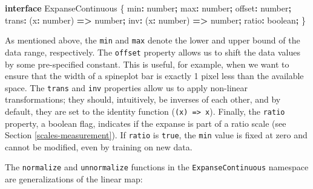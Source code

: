\documentclass[
  openany]{book}
\newenvironment{Shaded}{\begin{snugshade}}{\end{snugshade}}
\newcommand{\DataTypeTok}[1]{\textcolor[rgb]{0.13,0.29,0.53}{#1}}
\newcommand{\KeywordTok}[1]{\textcolor[rgb]{0.13,0.29,0.53}{\textbf{#1}}}
\newcommand{\NormalTok}[1]{#1}
\newcommand{\OperatorTok}[1]{\textcolor[rgb]{0.81,0.36,0.00}{\textbf{#1}}}
\theoremstyle{definition}
\theoremstyle{definition}
\theoremstyle{definition}
\theoremstyle{definition}
\theoremstyle{remark}
\begin{document}
\begin{Shaded}
\begin{Highlighting}[]
\KeywordTok{interface}\NormalTok{ ExpanseContinuous \{}
\NormalTok{  min}\OperatorTok{:} \DataTypeTok{number}\OperatorTok{;}
\NormalTok{  max}\OperatorTok{:} \DataTypeTok{number}\OperatorTok{;}
\NormalTok{  offset}\OperatorTok{:} \DataTypeTok{number}\OperatorTok{;}
\NormalTok{  trans}\OperatorTok{:}\NormalTok{ (x}\OperatorTok{:} \DataTypeTok{number}\NormalTok{) }\KeywordTok{=\textgreater{}} \DataTypeTok{number}\OperatorTok{;}
\NormalTok{  inv}\OperatorTok{:}\NormalTok{ (x}\OperatorTok{:} \DataTypeTok{number}\NormalTok{) }\KeywordTok{=\textgreater{}} \DataTypeTok{number}\OperatorTok{;}
\NormalTok{  ratio}\OperatorTok{:} \DataTypeTok{boolean}\OperatorTok{;}
\NormalTok{\}}
\end{Highlighting}
\end{Shaded}

As mentioned above, the \texttt{min} and \texttt{max} denote the lower and upper bound of the data range, respectively. The \texttt{offset} property allows us to shift the data values by some pre-specified constant. This is useful, for example, when we want to ensure that the width of a spineplot bar is exactly 1 pixel less than the available space. The \texttt{trans} and \texttt{inv} properties allow us to apply non-linear transformations; they should, intuitively, be inverses of each other, and by default, they are set to the identity function (\texttt{(x)\ =\textgreater{}\ x}). Finally, the \texttt{ratio} property, a boolean flag, indicates if the expanse is part of a ratio scale (see Section \ref{scales-measurement}). If \texttt{ratio} is \texttt{true}, the \texttt{min} value is fixed at zero and cannot be modified, even by training on new data.

The \texttt{normalize} and \texttt{unnormalize} functions in the \texttt{ExpanseContinuous} namespace are generalizations of the linear map:
\end{document}
